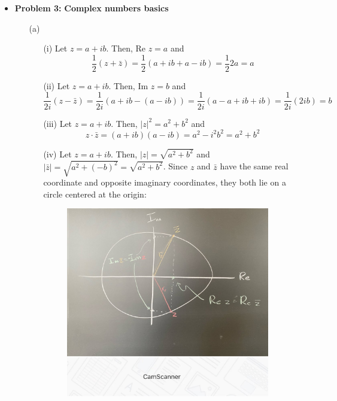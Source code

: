 \documentclass[12pt]{amsart}
\theoremstyle{definition}
\theoremstyle{remark}
\begin{document}
\begin{itemize}
\vspace{0.2 cm}

\item {\bf{Problem 3:}} {\bf{Complex numbers basics}}

\vspace{0.1 cm}
\begin{itemize}
\item[(a)]

\begin{itemize}
\item[(i)] Let $z=a+ib$. Then, $\text{Re }z=a$ and $$\frac{1}{2}(z+\bar{z})=\frac{1}{2}(a+ib+a-ib)=\frac{1}{2}2a=a$$

\vspace{0.1 cm}

\item[(ii)]Let $z=a+ib$. Then, $\text{Im }z=b$ and $$\frac{1}{2i}(z-\bar{z})=\frac{1}{2i}(a+ib-(a-ib))=\frac{1}{2i}(a-a+ib+ib)=\frac{1}{2i}(2ib)=b$$

\vspace{0.1 cm}

\item[(iii)]Let $z=a+ib$. Then, $|z|^{2}=a^{2}+b^{2}$ and $$z\cdot\bar{z}=(a+ib)(a-ib)=a^{2}-i^{2}b^{2}=a^{2}+b^{2}$$

\vspace{0.1 cm}

\item[(iv)] Let $z=a+ib$. Then, $|z|=\sqrt{a^{2}+b^{2}}$ and $|\bar{z}|=\sqrt{a^{2}+(-b)^{2}}=\sqrt{a^{2}+b^{2}}$. Since $z$ and $\bar{z}$ have the same real coordinate and opposite imaginary coordinates, they both lie on a circle centered at the origin:
\begin{figure}[H]

  \includegraphics[width=3.5in]{Long image 2024-02-09 11.29.57.jpg}
\end{figure}
\end{itemize}


\end{itemize}
\end{itemize}
\end{document}
